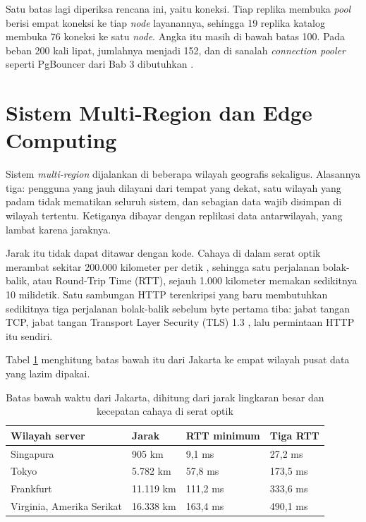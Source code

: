 Satu batas lagi diperiksa rencana ini, yaitu koneksi. Tiap replika membuka
\textit{pool} berisi empat koneksi ke tiap \textit{node} layanannya, sehingga 19
replika katalog membuka 76 koneksi ke satu \textit{node}. Angka itu masih di bawah
batas 100. Pada beban 200 kali lipat, jumlahnya menjadi 152, dan di sanalah
\textit{connection pooler} seperti PgBouncer dari Bab 3 dibutuhkan
\cite{pgbouncer-features}.

\section{Sistem Multi-Region dan Edge Computing}

Sistem \textit{multi-region} dijalankan di beberapa wilayah geografis
sekaligus. Alasannya tiga: pengguna yang jauh dilayani dari tempat yang
dekat, satu wilayah yang padam tidak mematikan seluruh sistem, dan sebagian
data wajib disimpan di wilayah tertentu. Ketiganya dibayar dengan replikasi
data antarwilayah, yang lambat karena jaraknya.

Jarak itu tidak dapat ditawar dengan kode. Cahaya di dalam serat optik
merambat sekitar 200.000 kilometer per detik \cite{grigorik2013hpbn},
sehingga satu perjalanan bolak-balik, atau Round-Trip Time (RTT), sejauh
1.000 kilometer memakan sedikitnya 10 milidetik. Satu sambungan HTTP terenkripsi
yang baru membutuhkan sedikitnya tiga perjalanan bolak-balik sebelum byte pertama tiba:
jabat tangan TCP, jabat tangan Transport Layer Security (TLS) 1.3
\cite{rfc8446}, lalu permintaan HTTP itu sendiri.

Tabel \ref{tab:region14} menghitung batas bawah itu dari Jakarta ke empat
wilayah pusat data yang lazim dipakai.

\begin{table}[!htb]
  \centering
  \caption{Batas bawah waktu dari Jakarta, dihitung dari jarak lingkaran besar
           dan kecepatan cahaya di serat optik}
  \label{tab:region14}
  \begin{tabularx}{\textwidth}{Xlll}
    \hline
    \textbf{Wilayah server} & \textbf{Jarak} & \textbf{RTT minimum} & \textbf{Tiga RTT} \\
    \hline
    Singapura & 905 km & 9,1 ms & 27,2 ms \\
    \hline
    Tokyo & 5.782 km & 57,8 ms & 173,5 ms \\
    \hline
    Frankfurt & 11.119 km & 111,2 ms & 333,6 ms \\
    \hline
    Virginia, Amerika Serikat & 16.338 km & 163,4 ms & 490,1 ms \\
    \hline
  \end{tabularx}
\end{table}

